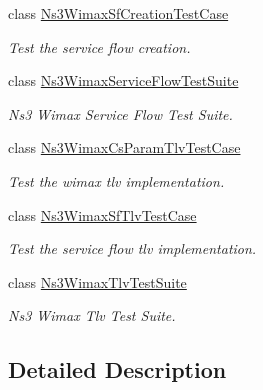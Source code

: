 \begin{DoxyCompactItemize}
class \hyperlink{classNs3WimaxSfCreationTestCase}{Ns3\+Wimax\+Sf\+Creation\+Test\+Case}
\begin{DoxyCompactList}\small\item\em Test the service flow creation. \end{DoxyCompactList}\item 
class \hyperlink{classNs3WimaxServiceFlowTestSuite}{Ns3\+Wimax\+Service\+Flow\+Test\+Suite}
\begin{DoxyCompactList}\small\item\em Ns3 Wimax Service Flow Test Suite. \end{DoxyCompactList}\item 
class \hyperlink{classNs3WimaxCsParamTlvTestCase}{Ns3\+Wimax\+Cs\+Param\+Tlv\+Test\+Case}
\begin{DoxyCompactList}\small\item\em Test the wimax tlv implementation. \end{DoxyCompactList}\item 
class \hyperlink{classNs3WimaxSfTlvTestCase}{Ns3\+Wimax\+Sf\+Tlv\+Test\+Case}
\begin{DoxyCompactList}\small\item\em Test the service flow tlv implementation. \end{DoxyCompactList}\item 
class \hyperlink{classNs3WimaxTlvTestSuite}{Ns3\+Wimax\+Tlv\+Test\+Suite}
\begin{DoxyCompactList}\small\item\em Ns3 Wimax Tlv Test Suite. \end{DoxyCompactList}\end{DoxyCompactItemize}


\subsection{Detailed Description}
